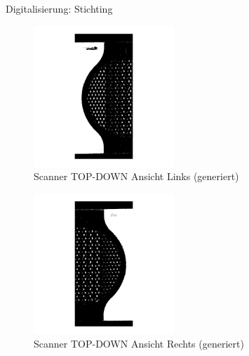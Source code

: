 \documentclass[../slides.tex]{subfiles}
\begin{document}
  \begin{frame}{Digitalisierung: Stichting}
    \begin{minipage}[]{.49\textwidth}
        \begin{figure}[]
            \includegraphics[width=150pt]{img_niklas/scanner_2.png}
            \caption{Scanner TOP-DOWN Ansicht Links (generiert)}
            \label{fig:scanner_left}
          \end{figure}
    \end{minipage}
    \hfill
    \begin{minipage}[]{.49\textwidth}
      \begin{figure}[]
        \includegraphics[width=150pt]{img_niklas/scanner_1.png}
        \caption{Scanner TOP-DOWN Ansicht Rechts (generiert)}
        \label{fig:scanner_right}
      \end{figure}
    \end{minipage}
  \end{frame}
\end{document}
